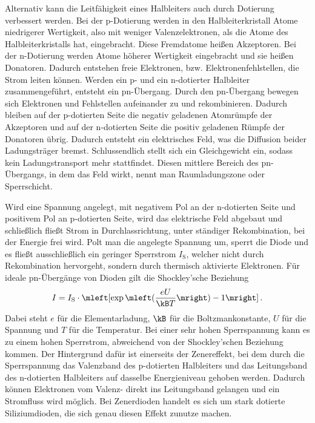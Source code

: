 \documentclass[
12pt,
a4paper,
bibliography=totocnumbered, %
BCOR=1cm, %
oneside, %
]{scrartcl}
\begin{document}
Alternativ kann die Leitfähigkeit eines Halbleiters auch durch Dotierung verbessert werden. Bei der p-Dotierung werden in den Halbleiterkristall Atome niedrigerer Wertigkeit, also mit weniger Valenzelektronen, als die Atome des Halbleiterkristalls hat, eingebracht. Diese Fremdatome heißen Akzeptoren. Bei der n-Dotierung werden Atome höherer Wertigkeit eingebracht und sie heißen Donatoren. Dadurch entstehen freie Elektronen, bzw. Elektronenfehlstellen, die Strom leiten können.
Werden ein p- und ein n-dotierter Halbleiter zusammengeführt, entsteht ein pn-Übergang. Durch den pn-Übergang bewegen sich Elektronen und Fehlstellen aufeinander zu und rekombinieren. Dadurch bleiben auf der p-dotierten Seite die negativ geladenen Atomrümpfe der Akzeptoren und auf der n-dotierten Seite die positiv geladenen Rümpfe der Donatoren übrig. Dadurch entsteht ein elektrisches Feld, was die Diffusion beider Ladungsträger bremst. Schlussendlich stellt sich ein Gleichgewicht ein, sodass kein Ladungstransport mehr stattfindet. Diesen mittlere Bereich des pn-Übergangs, in dem das Feld wirkt, nennt man Raumladungszone oder Sperrschicht.

Wird eine Spannung angelegt, mit negativem Pol an der n-dotierten Seite und positivem Pol an p-dotierten Seite, wird das elektrische Feld abgebaut und schließlich fließt Strom in Durchlassrichtung, unter ständiger Rekombination, bei der Energie frei wird. Polt man die angelegte Spannung um, sperrt die Diode und es fließt ausschließlich ein geringer Sperrstrom \(I_{\text{S}}\), welcher nicht durch Rekombination hervorgeht, sondern durch thermisch aktivierte Elektronen. Für  ideale pn-Übergänge von Dioden gilt die  Shockley'sche Beziehung
\begin{equation}
I=I_{\text{S}} \cdot \mleft[\exp\mleft( \frac{eU}{\kB T}\mright)-1 \mright]\,.
\end{equation}
Dabei steht \(e\) für die Elementarladung, \(\kB\) für die Boltzmankonstante, \(U\) für die Spannung und \(T\) für die Temperatur.
Bei einer sehr hohen Sperrspannung kann es zu einem hohen Sperrstrom, abweichend von der Shockley'schen Beziehung kommen. Der Hintergrund dafür ist einerseits der Zenereffekt, bei dem durch die Sperrspannung das Valenzband des p-dotierten Halbleiters und das Leitungsband des n-dotierten Halbleiters auf dasselbe Energieniveau gehoben werden. Dadurch können Elektronen vom Valenz- direkt ins Leitungsband gelangen und ein Stromfluss wird möglich. Bei Zenerdioden handelt es sich um stark dotierte Siliziumdioden, die sich genau diesen Effekt zunutze machen.
\end{document}
